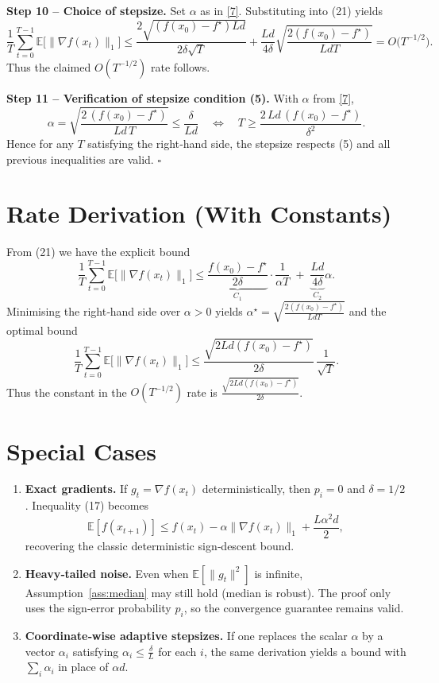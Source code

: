 \documentclass[11pt]{article}
\newcommand{\EE}{\mathbb{E}}
\begin{document}
\noindent\textbf{Step 10 – Choice of stepsize.}  
Set $\alpha$ as in \eqref{7}. Substituting into (21) yields
\[
\frac{1}{T}\sum_{t=0}^{T-1}\EE\!\bigl[\|\nabla f(x_t)\|_{1}\bigr]
\le
\frac{2\sqrt{(f(x_0)-f^{\star})L d}}{2\delta\sqrt{T}}
+\frac{L d}{4\delta}\sqrt{\frac{2(f(x_0)-f^{\star})}{L d T}}
=O\!\bigl(T^{-1/2}\bigr).
\tag{22}
\]
Thus the claimed $O(T^{-1/2})$ rate follows.

\noindent\textbf{Step 11 – Verification of stepsize condition (5).}  
With $\alpha$ from \eqref{7},
\[
\alpha = \sqrt{\frac{2\,(f(x_0)-f^{\star})}{L d\,T}}
\le \frac{\delta}{L d}
\quad\Longleftrightarrow\quad
T\ge \frac{2\,L d\,(f(x_0)-f^{\star})}{\delta^{2}}.
\]
Hence for any $T$ satisfying the right‑hand side, the stepsize respects (5) and all previous inequalities are valid. \hfill $\square$

\section*{Rate Derivation (With Constants)}
From (21) we have the explicit bound
\[
\frac{1}{T}\sum_{t=0}^{T-1}\EE\!\bigl[\|\nabla f(x_t)\|_{1}\bigr]
\le
\underbrace{\frac{f(x_0)-f^{\star}}{2\delta}}_{C_{1}}
\cdot\frac{1}{\alpha T}
\;+\;
\underbrace{\frac{L d}{4\delta}}_{C_{2}}\alpha .
\tag{23}
\]
Minimising the right‑hand side over $\alpha>0$ yields $\alpha^{\star}= \sqrt{\frac{2(f(x_0)-f^{\star})}{L d T}}$ and the optimal bound
\[
\frac{1}{T}\sum_{t=0}^{T-1}\EE\!\bigl[\|\nabla f(x_t)\|_{1}\bigr]
\le
\frac{\sqrt{2 L d (f(x_0)-f^{\star})}}{2\delta}\,\frac{1}{\sqrt{T}}.
\tag{24}
\]
Thus the constant in the $O(T^{-1/2})$ rate is $\frac{\sqrt{2 L d (f(x_0)-f^{\star})}}{2\delta}$.

\section*{Special Cases}
\begin{enumerate}[leftmargin=*]
\item \textbf{Exact gradients.} If $g_t=\nabla f(x_t)$ deterministically, then $p_i=0$ and $\delta=1/2$. Inequality (17) becomes
\[
\EE[f(x_{t+1})]\le f(x_t)-\alpha\|\nabla f(x_t)\|_{1}+\frac{L\alpha^{2}d}{2},
\]
recovering the classic deterministic sign‑descent bound.
\item \textbf{Heavy‑tailed noise.} Even when $\EE[\|g_t\|^{2}]$ is infinite, Assumption~\ref{ass:median} may still hold (median is robust). The proof only uses the sign‑error probability $p_i$, so the convergence guarantee remains valid.
\item \textbf{Coordinate‑wise adaptive stepsizes.} If one replaces the scalar $\alpha$ by a vector $\alpha_i$ satisfying $\alpha_i\le \frac{\delta}{L}$ for each $i$, the same derivation yields a bound with $\sum_i \alpha_i$ in place of $\alpha d$.
\end{enumerate}
\end{document}
